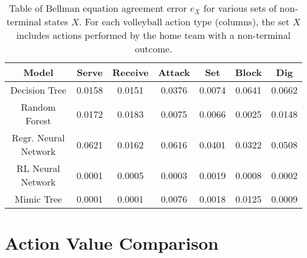 \documentclass{sfuthesis}
\begin{document}
	\begin{table}
		\centering
		\begin{tabular}{c|cccccc}
			\textbf{Model}    & \textbf{Serve} & \textbf{Receive} & \textbf{Attack} & \textbf{Set} & \textbf{Block} & \textbf{Dig} \\ \hline
			Decision Tree     & 0.0158                  & 0.0151                    & 0.0376                   & 0.0074                & 0.0641                  & 0.0662                \\
			Random Forest     & 0.0172                  & 0.0183                    & 0.0075                   & 0.0066                & 0.0025                  & 0.0148                \\
			Regr. Neural Network & 0.0621                  & 0.0162                    & 0.0616                   & 0.0401                & 0.0322                 & 0.0508                \\
			RL Neural Network & 0.0001                  & 0.0005                    & 0.0003                   & 0.0019                & 0.0008                  & 0.0002                \\
			Mimic Tree        & 0.0001                  & 0.0001                    & 0.0076                   & 0.0018                & 0.0125                  & 0.0009               
		\end{tabular}
		\caption{Table of Bellman equation agreement error $e_X$ for various sets of non-terminal states $X$. For each volleyball action type (columns), the set $X$ includes actions performed by the home team with a non-terminal outcome.}
		\label{tab:bellman-agreement}
	\end{table}
	
	\section{Action Value Comparison}
	
\end{document}

